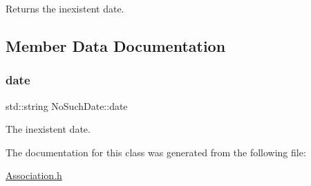 Returns the inexistent date. 



\subsection{Member Data Documentation}
\mbox{\label{classNoSuchDate_af3b260da65ff8089d325b948e895f6b3}} 
\subsubsection{\texorpdfstring{date}{date}}
{\footnotesize\ttfamily std\+::string No\+Such\+Date\+::date\hspace{0.3cm}{\ttfamily [private]}}



The inexistent date. 



The documentation for this class was generated from the following file\+:\begin{DoxyCompactItemize}
\item 
\hyperlink{Association_8h}{Association.\+h}\end{DoxyCompactItemize}
